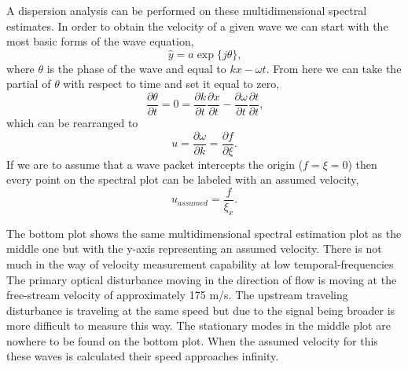 A dispersion analysis can be performed on these multidimensional spectral estimates.
In order to obtain the velocity of a given wave we can start with the most basic forms of the wave equation,
\begin{equation}
  \hat{y} = a\exp\{j\theta\} \textrm{,}
\end{equation}
where $\theta$ is the phase of the wave and equal to $kx-\omega t$.
From here we can take the partial of $\theta$ with respect to time and set it equal to zero,
\begin{equation}
  \frac{\partial\theta}{\partial t} = 0 = \frac{\partial k}{\partial t}\frac{\partial x}{\partial t}-\frac{\partial \omega}{\partial t}\frac{\partial t}{\partial t} \textrm{,}
\end{equation}
which can be rearranged to
\begin{equation}
  u = \frac{\partial \omega}{\partial k} = \frac{\partial f}{\partial \xi} \textrm{.}
\end{equation}
If we are to assume that a wave packet intercepts the origin ($f=\xi=0$) then every point on the spectral plot can be labeled with an assumed velocity,
\begin{equation}
  u_{assumed} = \frac{f}{\xi_x} \textrm{.}
  \label{eqn:04_velocity_assumed}
\end{equation}

The bottom plot shows the same multidimensional spectral estimation plot as the middle one but with the y-axis representing an assumed velocity.
There is not much in the way of velocity measurement capability at low temporal-frequencies
The primary optical disturbance moving in the direction of flow is moving at the free-stream velocity of approximately 175 m/s.
The upstream traveling disturbance is traveling at the same speed but due to the signal being broader is more difficult to measure this way.
The stationary modes in the middle plot are nowhere to be found on the bottom plot.
When the assumed velocity for this these waves is calculated their speed approaches infinity.

